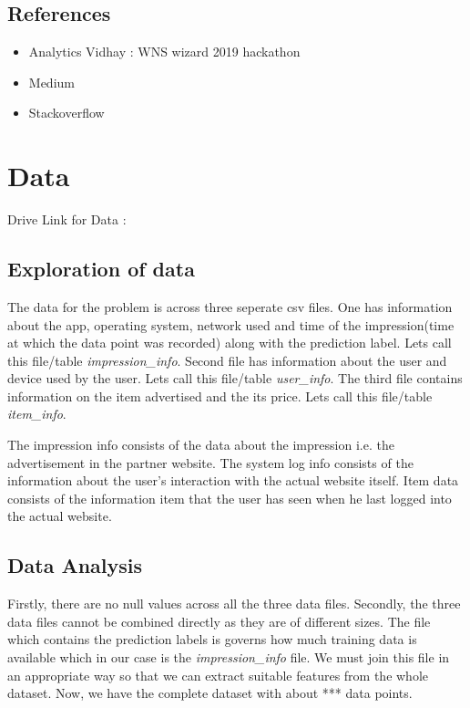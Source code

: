 \documentclass{scrreprt}
\begin{document}
\section{References}

\begin{itemize}
\item Analytics Vidhay : WNS wizard 2019 hackathon
\item Medium 
\item Stackoverflow
\end{itemize}



\chapter{Data}
Drive Link for Data :
{\color{blue}{ \\ https://drive.google.com/open?id=1wxn1bqwKrXXeEeYc47kjkuQKauzppp3f}}
\section{Exploration of data}
The data for the problem is across three seperate csv files. One has information about the app, operating system, network used and time of the impression(time at which the data point was recorded) along with the prediction label. Lets call this file/table \textit{impression_info}. Second file has information about the user and device used by the user. Lets call this file/table \textit{user_info}. The third file contains information on the item advertised and the its price. Lets call this file/table \textit{item_info}.

The impression info consists of the data about the impression i.e. the advertisement in the partner website. The system log info consists of the information about the user's interaction with the actual website itself.
Item data consists of the information item that the user has seen when he last logged into the actual website.

\section{Data Analysis}
Firstly, there are no null values across all the three data files. Secondly, the three data files cannot be combined directly as they are of different sizes. The file which contains the prediction labels is governs how much training data is available which in our case is the \textit{impression_info} file. We must join this file in an appropriate way so that we can extract suitable features from the whole dataset. Now, we have the complete dataset with about *** data points.
\end{document}
